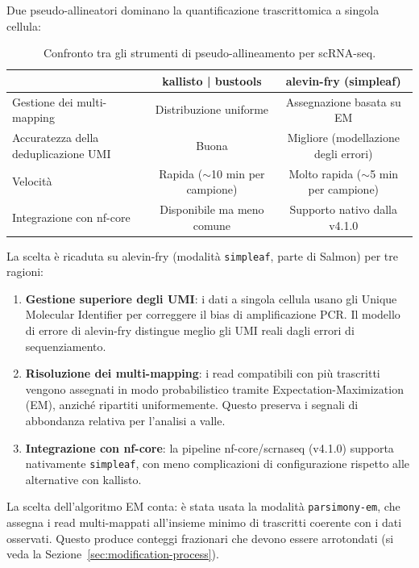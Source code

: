 Due pseudo-allineatori dominano la quantificazione trascrittomica a singola cellula:

\begin{table}[htbp]
    \centering
    \caption{Confronto tra gli strumenti di pseudo-allineamento per scRNA-seq.}\label{tab:pseudoalign-tools}
    \vspace{0.5em}
    \small
    \setlength{\tabcolsep}{3pt}
    \begin{tabular}{lcc}
        \toprule
        & \textbf{kallisto | bustools} & \textbf{alevin-fry (simpleaf)} \\
        \midrule
        Gestione dei multi-mapping & Distribuzione uniforme & Assegnazione basata su EM \\
        Accuratezza della deduplicazione UMI & Buona & Migliore (modellazione degli errori) \\
        Velocità & Rapida ($\sim$10 min per campione) & Molto rapida ($\sim$5 min per campione) \\
        Integrazione con nf-core & Disponibile ma meno comune & Supporto nativo dalla v4.1.0 \\
        \bottomrule
    \end{tabular}
\end{table}

La scelta è ricaduta su alevin-fry (modalità \texttt{simpleaf}, parte di Salmon) per tre ragioni:

\begin{enumerate}
    \item \textbf{Gestione superiore degli UMI}: i dati a singola cellula usano gli Unique Molecular Identifier per correggere il bias di amplificazione PCR. Il modello di errore di alevin-fry distingue meglio gli UMI reali dagli errori di sequenziamento.
    \item \textbf{Risoluzione dei multi-mapping}: i read compatibili con più trascritti vengono assegnati in modo probabilistico tramite Expectation-Maximization (EM), anziché ripartiti uniformemente. Questo preserva i segnali di abbondanza relativa per l'analisi a valle.
    \item \textbf{Integrazione con nf-core}: la pipeline nf-core/scrnaseq (v4.1.0) supporta nativamente \texttt{simpleaf}, con meno complicazioni di configurazione rispetto alle alternative con kallisto.
\end{enumerate}

La scelta dell'algoritmo EM conta: è stata usata la modalità \texttt{parsimony-em}, che assegna i read multi-mappati all'insieme minimo di trascritti coerente con i dati osservati. Questo produce conteggi frazionari che devono essere arrotondati (si veda la Sezione~\ref{sec:modification-process}).

